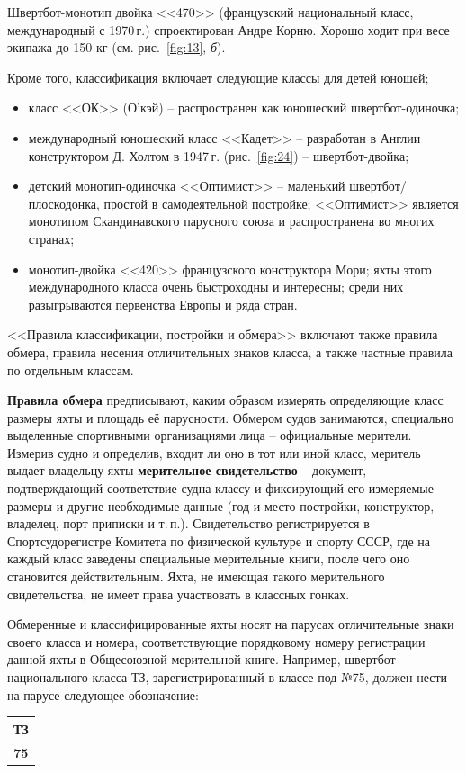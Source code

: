 \documentclass[a4paper, 12pt, twoside, final]{scrbook}
\begin{document}
Швертбот-монотип двойка <<470>> (французский национальный класс, международный
с 1970\,г.) спроектирован Андре Корню. Хорошо ходит при весе экипажа
до 150 кг (см. рис.~\ref{fig:13}, \emph{б}).

Кроме того, классификация включает следующие классы для детей юношей;
\begin{itemize}
\item класс <<ОК>> (О'кэй) \--- распространен как юношеский швертбот-одиночка;
\item международный юношеский класс <<Кадет>> \--- разработан в Англии конструктором
Д. Холтом в 1947\,г. (рис.~\ref{fig:24}) \--- швертбот-двойка;
\item детский монотип-одиночка <<Оптимист>> \--- маленький швертбот\-/плоскодонка,
простой в самодеятельной постройке; <<Оптимист>> является монотипом
Скандинавского парусного союза и распространена во многих странах;
\item монотип-двойка <<420>> французского конструктора Мори; яхты этого международного
класса очень быстроходны и интересны; среди них разыгрываются первенства
Европы и ряда стран.
\end{itemize}
<<Правила классификации, постройки и обмера>> включают также правила
обмера, правила несения отличительных знаков класса, а также частные
правила по отдельным классам.

\textbf{Правила обмера} предписывают, каким образом измерять определяющие
класс размеры яхты и площадь её парусности. Обмером судов занимаются,
специально выделенные спортивными организациями лица \--- официальные
мерители. Измерив судно и определив, входит ли оно в тот или иной
класс, меритель выдает владельцу яхты \textbf{мерительное свидетельство}
\--- документ, подтверждающий соответствие судна классу и фиксирующий
его измеряемые размеры и другие необходимые данные (год и место постройки,
конструктор, владелец, порт приписки и т.\,п.). Свидетельство регистрируется
в Спортсудорегистре Комитета по физической культуре и спорту СССР,
где на каждый класс заведены специальные мерительные книги, после
чего оно становится действительным. Яхта, не имеющая такого мерительного
свидетельства, не имеет права участвовать в классных гонках.

Обмеренные и классифицированные яхты носят на парусах отличительные
знаки своего класса и номера, соответствующие порядковому номеру регистрации
данной яхты в Общесоюзной мерительной книге. Например, швертбот национального
класса ТЗ, зарегистрированный в классе под №75, должен нести на парусе
следующее обозначение:%
\begin{tabular}{c}
\textbf{ТЗ}\tabularnewline
\hline 
\textbf{75}\tabularnewline
\end{tabular}
\end{document}
